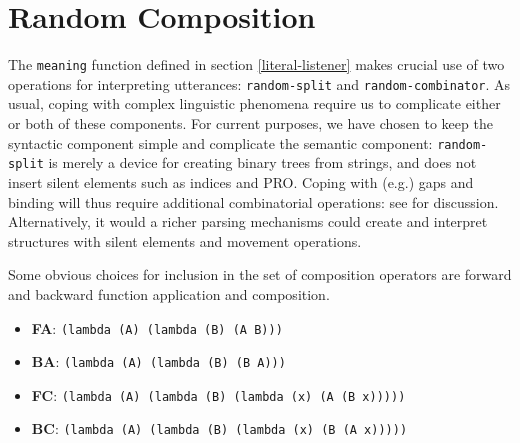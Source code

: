 \documentclass[pdfextras]{handbook}
\begin{document}
\section{Random Composition}
\label{composition}
The \lstinline{meaning} function defined in section \ref{literal-listener} makes crucial use of two operations for interpreting utterances: \lstinline{random-split} and \lstinline{random-combinator}. 
As usual, coping with complex linguistic phenomena require us to complicate either or both of these components.
For current purposes, we have chosen to keep the syntactic component simple and complicate the semantic component: \lstinline{random-split} is merely a device for creating binary trees from strings, and does not insert silent elements such as indices and PRO. 
Coping with (e.g.) gaps and binding will thus require additional combinatorial operations: see  \citep{jacobson99,steedman01,barker05} for discussion.
Alternatively, it would a richer parsing mechanisms could create and interpret structures with silent elements and movement operations.

Some obvious choices for inclusion in the set of composition operators are forward and backward function application and composition. 
\begin{itemize}
\item \textbf{FA}: \lstinline{(lambda (A) (lambda (B) (A B)))}
\item \textbf{BA}: \lstinline{(lambda (A) (lambda (B) (B A)))}
\item \textbf{FC}: \lstinline{(lambda (A) (lambda (B) (lambda (x) (A (B x)))))}
\item \textbf{BC}: \lstinline{(lambda (A) (lambda (B) (lambda (x) (B (A x)))))}
\end{itemize}
\end{document}
